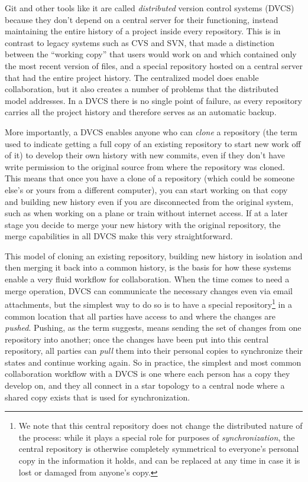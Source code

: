 \documentclass[ChapterTOCs,krantz2]{krantz} %
\begin{document}
Git and other tools like it are called \emph{distributed} version control
systems (DVCS) because they don't depend on a central server for their functioning,
instead maintaining the entire history of a project inside every repository.
This is in contrast to legacy systems such as CVS and SVN, that made a
distinction between the ``working copy'' that users would work on and which
contained only the most recent version of files, and a special repository
hosted on a central server that had the entire project history.  The
centralized model does enable collaboration, but it also creates a number of
problems that the distributed model addresses.  In a DVCS there is no single
point of failure, as every repository carries all the project history and
therefore serves as an automatic backup.

More importantly, a DVCS enables anyone who can \emph{clone} a repository (the
term used to indicate getting a full copy of an existing repository to start
new work off of it) to develop their own history with new commits, even if they
don't have write permission to the original source from where the repository
was cloned.  This means that once you have a clone of a repository (which could
be someone else's or yours from a different computer), you can start working on
that copy and building new history even if you are disconnected from the
original system, such as when working on a plane or train without internet
access.  If at a later stage you decide to merge your new history with the
original repository, the merge capabilities in all DVCS make this very
straightforward.

This model of cloning an existing repository, building new history in isolation
and then merging it back into a common history, is the basis for how these
systems enable a very fluid workflow for collaboration.  When the time comes to
need a merge operation, DVCS can communicate the necessary changes even
via email attachments, but the simplest way to do so is to have a special
repository\footnote{We note that this central repository does not change the
  distributed nature of the process: while it plays a special role for purposes
  of \emph{synchronization}, the central repository is otherwise completely
  symmetrical to everyone's personal copy in the information it holds, and can
  be replaced at any time in case it is lost or damaged from anyone's copy.} in
a common location that all parties have access to and where the changes are
\emph{pushed}.  Pushing, as the term suggests, means sending the set of
changes from one repository into another; once the changes have been put into
this central repository, all parties can \emph{pull} them into their personal
copies to synchronize their states and continue working again.  So in practice,
the simplest and most common collaboration workflow with a DVCS is one where
each person has a copy they develop on, and they all connect in a star topology
to a central node where a shared copy exists that is used for synchronization.
\end{document}
